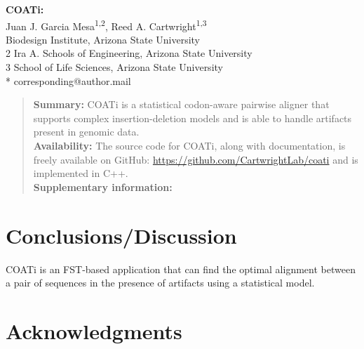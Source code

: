 



\begin{flushleft}
{\Large\textbf{COATi: }}
\newline
\\
Juan J. Garcia Mesa\textsuperscript{1,2},
Reed A. Cartwright\textsuperscript{1,3}
\\
 Biodesign Institute, Arizona State University
\\
2 Ira A. Schools of Engineering, Arizona State University
\\
3 School of Life Sciences, Arizona State University
\\
\bigskip
* corresponding@author.mail

\end{flushleft}

\begin{abstract}
\noindent \textbf{Summary:} COATi is a statistical codon-aware pairwise aligner
that supports complex insertion-deletion models and is able to handle artifacts
present in genomic data.\\  %
\textbf{Availability:} The source code for COATi, along with documentation, is
freely available on GitHub: \url{https://github.com/CartwrightLab/coati} and is
implemented in C++.\\
\textbf{Supplementary information:} %
\end{abstract}


\linenumbers







\section{Conclusions/Discussion}

COATi is an FST-based application that can find the optimal alignment between a
pair of sequences in the presence of artifacts using a statistical model.

\section*{Acknowledgments}

